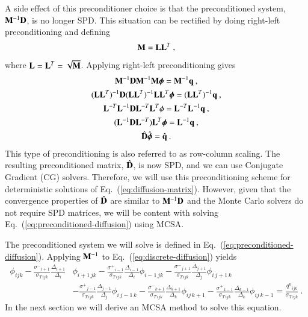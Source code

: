 \documentclass[preprint,12pt]{elsarticle}
\newcommand{\qn}{\ensuremath{q^n}}
\newcommand{\Di}{\ensuremath{\Delta_i}}
\newcommand{\Dj}{\ensuremath{\Delta_j}}
\newcommand{\Dk}{\ensuremath{\Delta_k}}
\newcommand{\sigT}{\ensuremath{\sigma_{T\,ijk}}}
\newcommand{\sigm}{\ensuremath{\sigma^{-}}}
\newcommand{\sigp}{\ensuremath{\sigma^{+}}}
\newcommand{\bphi}{\ensuremath{\boldsymbol{\phi}}}
\begin{document}
A side effect of this preconditioner choice is that the preconditioned
system, $\mathbf{M}^{-1}\mathbf{D}$, is no longer SPD.  This situation can be
rectified by doing right-left preconditioning and defining
\begin{equation}
  \mathbf{M} = \mathbf{L}\mathbf{L}^{T}\:,
\end{equation}
where $\mathbf{L} = \mathbf{L}^{T} = \sqrt{\mathbf{M}}$.  Applying right-left
preconditioning gives
\begin{equation}
  \begin{gathered}
    \ve{M}^{-1}\ve{D}\ve{M}^{-1}\ve{M}\bphi = \ve{M}^{-1}\ve{q}\:,\\
    (\ve{LL}^T)^{-1}\ve{D}(\ve{LL}^T)^{-1}\ve{LL}^T\bphi =
    (\ve{LL}^T)^{-1}\ve{q}\:, \\
    \ve{L}^{-T}\ve{L}^{-1}\ve{D}\ve{L}^{-T}\ve{L}^T\phi =
    \ve{L}^{-T}\ve{L}^{-1}\ve{q}\:,\\ 
    (\ve{L}^{-1}\ve{D}\ve{L}^{-T})\ve{L}^T\bphi = \ve{L}^{-1}\ve{q}\:,\\
    \hat{\ve{D}}\hat{\bphi} = \hat{\ve{q}}\:.
  \end{gathered}
  \label{eq:right-left-preconditioning}
\end{equation}
This type of preconditioning is also referred to as row-column
scaling.  The resulting preconditioned matrix, $\hat{\mathbf{D}}$, is now
SPD, and we can use Conjugate Gradient (CG) solvers.  Therefore, we
will use this preconditioning scheme for deterministic solutions of
Eq.~(\ref{eq:diffusion-matrix}).  However, given that the convergence
properties of $\hat{\mathbf{D}}$ are similar to $\mathbf{M}^{-1}\mathbf{D}$ and
the Monte Carlo solvers do not require SPD matrices, we will be
content with solving Eq.~(\ref{eq:preconditioned-diffusion}) using
MCSA.

The preconditioned system we will solve is defined in
Eq.~(\ref{eq:preconditioned-diffusion}).  Applying $\mathbf{M}^{-1}$ to
Eq.~(\ref{eq:discrete-diffusion}) yields
\begin{equation}
  \begin{aligned}
    \phi_{ijk} 
    - \frac{\sigm_{i+1}}{\sigT}\frac{\Delta_{i+1}}{\Di}&\phi_{i+1\,jk}
    - \frac{\sigp_{i-1}}{\sigT}\frac{\Delta_{i-1}}{\Di}\phi_{i-1\,jk}
    - \frac{\sigm_{j+1}}{\sigT}\frac{\Delta_{j+1}}{\Dj}\phi_{i\,j+1\,k} \\
    &- \frac{\sigp_{j-1}}{\sigT}\frac{\Delta_{j-1}}{\Dj}\phi_{i\,j-1\,k} 
    - \frac{\sigm_{k+1}}{\sigT}\frac{\Delta_{k+1}}{\Dk}\phi_{ij\,k+1}
    - \frac{\sigp_{k-1}}{\sigT}\frac{\Delta_{k-1}}{\Dk}\phi_{ij\,k-1}
    = \frac{\qn_{ijk}}{\sigT}\:.
  \end{aligned}
  \label{eq:preconditioned-discrete-diffusion}
\end{equation}
In the next section we will derive an MCSA method to solve this
equation.
\end{document}
